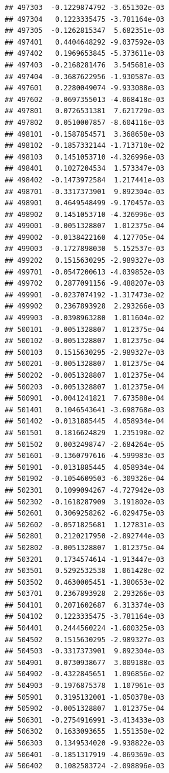 \documentclass[ignorenonframetext,]{beamer}
\begin{document}
\begin{frame}[fragile]
\begin{verbatim}
## 497303  -0.1229874792 -3.651302e-03
## 497304   0.1223335475 -3.781164e-03
## 497305  -0.1262815347  5.682351e-03
## 497401   0.4404648292 -9.037592e-03
## 497402   0.1969653845 -5.373611e-03
## 497403  -0.2168281476  3.545681e-03
## 497404  -0.3687622956 -1.930587e-03
## 497601   0.2280049074 -9.933088e-03
## 497602  -0.0697355013 -4.068418e-03
## 497801   0.0726531381  7.621729e-03
## 497802   0.0510007857 -8.604116e-03
## 498101  -0.1587854571  3.368658e-03
## 498102  -0.1857332144 -1.713710e-02
## 498103   0.1451053710 -4.326996e-03
## 498401   0.1027204534  1.573347e-03
## 498402  -0.1473972584  1.217441e-03
## 498701  -0.3317373901  9.892304e-03
## 498901   0.4649548499 -9.170457e-03
## 498902   0.1451053710 -4.326996e-03
## 499001  -0.0051328807  1.012375e-04
## 499002  -0.0138422160  4.127705e-04
## 499003  -0.1727898030  5.152537e-03
## 499202   0.1515630295 -2.989327e-03
## 499701  -0.0547200613 -4.039852e-03
## 499702   0.2877091156 -9.488207e-03
## 499901  -0.0237074192 -1.317473e-02
## 499902   0.2367893928  2.293266e-03
## 499903  -0.0398963280  1.011604e-02
## 500101  -0.0051328807  1.012375e-04
## 500102  -0.0051328807  1.012375e-04
## 500103   0.1515630295 -2.989327e-03
## 500201  -0.0051328807  1.012375e-04
## 500202  -0.0051328807  1.012375e-04
## 500203  -0.0051328807  1.012375e-04
## 500901  -0.0041241821  7.673588e-04
## 501401   0.1046543641 -3.698768e-03
## 501402  -0.0131885445  4.058934e-04
## 501501   0.1816624829  1.235198e-02
## 501502   0.0032498747 -2.684264e-05
## 501601  -0.1360797616 -4.599983e-03
## 501901  -0.0131885445  4.058934e-04
## 501902  -0.1054609503 -6.309326e-04
## 502301   0.1099094267 -4.727942e-03
## 502302  -0.1618287909  3.191802e-03
## 502601   0.3069258262 -6.029475e-03
## 502602  -0.0571825681  1.127831e-03
## 502801   0.2120217950 -2.892744e-03
## 502802  -0.0051328807  1.012375e-04
## 503201   0.1734574614 -1.913447e-03
## 503501   0.5292532538  1.061428e-02
## 503502   0.4630005451 -1.380653e-02
## 503701   0.2367893928  2.293266e-03
## 504101   0.2071602687  6.313374e-03
## 504102   0.1223335475 -3.781164e-03
## 504401   0.2444560224 -1.600325e-03
## 504502   0.1515630295 -2.989327e-03
## 504503  -0.3317373901  9.892304e-03
## 504901   0.0730938677  3.009188e-03
## 504902  -0.4322845651  1.096856e-02
## 504903  -0.1976875378  1.107961e-03
## 505901   0.3195132001 -1.050378e-03
## 505902  -0.0051328807  1.012375e-04
## 506301  -0.2754916991 -3.413433e-03
## 506302   0.1633093655  1.551350e-02
## 506303   0.1349534020 -9.938822e-03
## 506401  -0.1851317919 -4.069369e-03
## 506402   0.1082583724 -2.098896e-03

\end{verbatim}
\end{frame}
\end{document}
